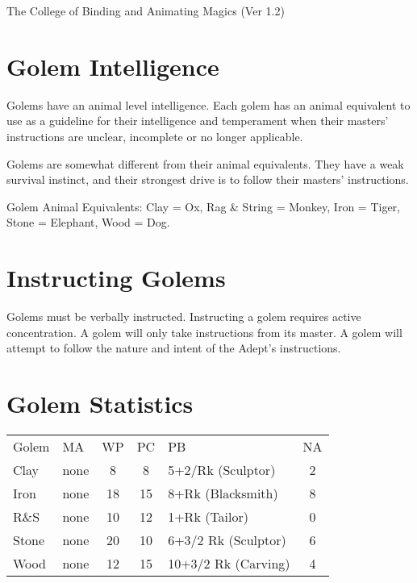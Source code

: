 \begin{Chapter}{The College of Binding and Animating Magics (Ver 1.2)}
\begin{Description}
\end{Description}
  
\section{Golem Intelligence}

Golems have an animal level intelligence.  Each golem has an animal
equivalent to use as a guideline for their intelligence and
temperament when their masters’ instructions are unclear, incomplete
or no longer applicable.

Golems are somewhat different from their animal equivalents.  They
have a weak survival instinct, and their strongest drive is to follow
their masters’ instructions.

Golem Animal Equivalents: Clay = Ox, Rag \& String = Monkey, Iron =
Tiger, Stone = Elephant, Wood = Dog.

\section{Instructing Golems}

Golems must be verbally instructed.  Instructing a golem requires
active concentration. A golem will only take instructions from its
master.  A golem will attempt to follow the nature and intent of the
Adept’s instructions.


\section{Golem Statistics}

\begin{small}
\begin{tabularx}{\columnwidth}{llccXc} \\
Golem	& MA	& WP	& PC	& PB			& NA \\
Clay	& none	& 8	& 8	& 5+2/Rk (Sculptor)	& 2 \\
Iron	& none	& 18	& 15	& 8+Rk (Blacksmith)	& 8 \\
R\&S	& none	& 10	& 12	& 1+Rk (Tailor)		& 0 \\
Stone	& none	& 20	& 10	& 6+3/2 Rk (Sculptor)	& 6 \\
Wood	& none	& 12	& 15	& 10+3/2 Rk (Carving)	& 4 \\
\end{tabularx} 
\end{small}


\end{Chapter}
